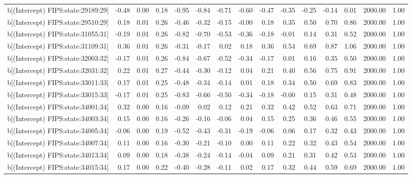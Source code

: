 \begin{table}[ht]
\begin{tabular}{rrrrrrrrrrrrrrr}
  b[(Intercept) FIPS:state:29189:29] & -0.48 & 0.00 & 0.18 & -0.95 & -0.84 & -0.71 & -0.60 & -0.47 & -0.35 & -0.25 & -0.14 & 0.01 & 2000.00 & 1.00 \\ 
  b[(Intercept) FIPS:state:29510:29] & 0.18 & 0.01 & 0.26 & -0.46 & -0.32 & -0.15 & -0.00 & 0.18 & 0.35 & 0.50 & 0.70 & 0.86 & 2000.00 & 1.00 \\ 
  b[(Intercept) FIPS:state:31055:31] & -0.19 & 0.01 & 0.26 & -0.82 & -0.70 & -0.53 & -0.36 & -0.18 & -0.01 & 0.14 & 0.31 & 0.52 & 2000.00 & 1.00 \\ 
  b[(Intercept) FIPS:state:31109:31] & 0.36 & 0.01 & 0.26 & -0.31 & -0.17 & 0.02 & 0.18 & 0.36 & 0.54 & 0.69 & 0.87 & 1.06 & 2000.00 & 1.00 \\ 
  b[(Intercept) FIPS:state:32003:32] & -0.17 & 0.01 & 0.26 & -0.84 & -0.67 & -0.52 & -0.34 & -0.17 & 0.01 & 0.16 & 0.35 & 0.50 & 2000.00 & 1.00 \\ 
  b[(Intercept) FIPS:state:32031:32] & 0.22 & 0.01 & 0.27 & -0.44 & -0.30 & -0.12 & 0.04 & 0.21 & 0.40 & 0.56 & 0.75 & 0.91 & 2000.00 & 1.00 \\ 
  b[(Intercept) FIPS:state:33011:33] & 0.17 & 0.01 & 0.25 & -0.48 & -0.34 & -0.14 & 0.01 & 0.18 & 0.34 & 0.50 & 0.69 & 0.83 & 2000.00 & 1.00 \\ 
  b[(Intercept) FIPS:state:33015:33] & -0.17 & 0.01 & 0.25 & -0.83 & -0.66 & -0.50 & -0.34 & -0.18 & -0.00 & 0.15 & 0.31 & 0.48 & 2000.00 & 1.00 \\ 
  b[(Intercept) FIPS:state:34001:34] & 0.32 & 0.00 & 0.16 & -0.09 & 0.02 & 0.12 & 0.21 & 0.32 & 0.42 & 0.52 & 0.63 & 0.71 & 2000.00 & 1.00 \\ 
  b[(Intercept) FIPS:state:34003:34] & 0.15 & 0.00 & 0.16 & -0.26 & -0.16 & -0.06 & 0.04 & 0.15 & 0.25 & 0.36 & 0.46 & 0.55 & 2000.00 & 1.00 \\ 
  b[(Intercept) FIPS:state:34005:34] & -0.06 & 0.00 & 0.19 & -0.52 & -0.43 & -0.31 & -0.19 & -0.06 & 0.06 & 0.17 & 0.32 & 0.43 & 2000.00 & 1.00 \\ 
  b[(Intercept) FIPS:state:34007:34] & 0.11 & 0.00 & 0.16 & -0.30 & -0.21 & -0.10 & 0.00 & 0.11 & 0.22 & 0.32 & 0.43 & 0.54 & 2000.00 & 1.00 \\ 
  b[(Intercept) FIPS:state:34013:34] & 0.09 & 0.00 & 0.18 & -0.38 & -0.24 & -0.14 & -0.04 & 0.09 & 0.21 & 0.31 & 0.42 & 0.53 & 2000.00 & 1.00 \\ 
  b[(Intercept) FIPS:state:34015:34] & 0.17 & 0.00 & 0.22 & -0.40 & -0.28 & -0.11 & 0.02 & 0.17 & 0.32 & 0.44 & 0.59 & 0.69 & 2000.00 & 1.00 \\ 

\end{tabular}
\end{table}

